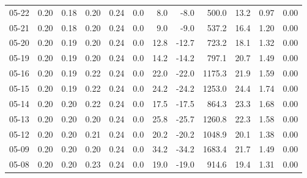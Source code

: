 \begin{threeparttable}
{\begin{tabular}{lrrrrrrrrrrr}
  05-22 &          0.20 &          0.18 &          0.20 &        0.24 &                 0.0 &                 8.0 &       -8.0 &               500.0 &             13.2 &            0.97 &                   0.00 \\
  05-21 &          0.20 &          0.18 &          0.20 &        0.24 &                 0.0 &                 9.0 &       -9.0 &               537.2 &             16.4 &            1.20 &                   0.00 \\
  05-20 &          0.20 &          0.19 &          0.20 &        0.24 &                 0.0 &                12.8 &      -12.7 &               723.2 &             18.1 &            1.32 &                   0.00 \\
  05-19 &          0.20 &          0.19 &          0.20 &        0.24 &                 0.0 &                14.2 &      -14.2 &               797.1 &             20.7 &            1.49 &                   0.00 \\
  05-16 &          0.20 &          0.19 &          0.22 &        0.24 &                 0.0 &                22.0 &      -22.0 &              1175.3 &             21.9 &            1.59 &                   0.00 \\
  05-15 &          0.20 &          0.19 &          0.22 &        0.24 &                 0.0 &                24.2 &      -24.2 &              1253.0 &             24.4 &            1.74 &                   0.00 \\
  05-14 &          0.20 &          0.20 &          0.22 &        0.24 &                 0.0 &                17.5 &      -17.5 &               864.3 &             23.3 &            1.68 &                   0.00 \\
  05-13 &          0.20 &          0.20 &          0.20 &        0.24 &                 0.0 &                25.8 &      -25.7 &              1260.8 &             22.3 &            1.58 &                   0.00 \\
  05-12 &          0.20 &          0.20 &          0.21 &        0.24 &                 0.0 &                20.2 &      -20.2 &              1048.9 &             20.1 &            1.38 &                   0.00 \\
  05-09 &          0.20 &          0.20 &          0.20 &        0.24 &                 0.0 &                34.2 &      -34.2 &              1683.4 &             21.7 &            1.49 &                   0.00 \\
  05-08 &          0.20 &          0.20 &          0.23 &        0.24 &                 0.0 &                19.0 &      -19.0 &               914.6 &             19.4 &            1.31 &                   0.00 \\

\end{tabular}}
\end{threeparttable}
